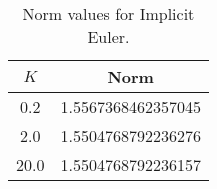 \begin{table}[htbp]
	 \centering
	 \caption{Norm values for Implicit Euler.}
	 \begin{tabular}{cc}
		 \toprule
		 $K$ & Norm \\ 
		 \midrule 
		 0.2 & 1.5567368462357045 \\ 
		 2.0 & 1.5504768792236276 \\ 
		 20.0 & 1.5504768792236157 \\ 
		 \bottomrule 
	 \end{tabular} 
	 \label{tab:error ie} 
\end{table}